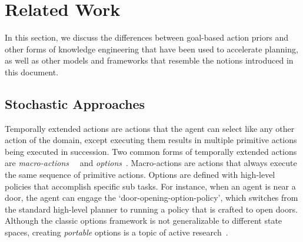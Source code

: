 \documentclass[11pt]{article}
\begin{document}
%
%
%

\section{Related Work}
\label{sec:related_work}

In this section, we discuss the differences between goal-based action priors
and other forms of knowledge engineering that have been used
to accelerate planning, as well as other models and frameworks that resemble the notions introduced in this document.

\subsection{Stochastic Approaches}

Temporally extended actions are actions that the agent can select like
any other action of the domain, except executing them results in
multiple primitive actions being executed in succession. Two common
forms of temporally extended actions are {\em
  macro-actions}~\cite{hauskrecht98} ~and {\em
  options}~\cite{sutton99}.  Macro-actions are actions that always
execute the same sequence of primitive actions. Options are defined
with high-level policies that accomplish specific sub tasks. For
instance, when an agent is near a door, the agent can engage the
`door-opening-option-policy', which switches from the standard
high-level planner to running a policy that is crafted to open doors.
Although the classic options framework is not generalizable to
different state spaces, creating {\em portable} options is a topic of
active research~\cite{konidaris07,konidaris2009efficient,Ravindran03analgebraic,andre2002state,konidaris2012transfer}.
\end{document}
